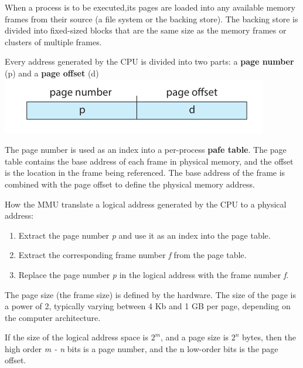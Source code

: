 \documentclass[10pt]{article}
\newcommand{\tf}{\textbf}
\newcommand{\ti}{\textit}
\begin{document}
\par{When a process is to be executed,its pages are loaded into any available memory frames from their source (a file system or the backing store). The backing store is divided into fixed-sized blocks that are the same size as the memory frames or clusters of multiple frames.} \\ 

\par{Every address generated by the CPU is divided into two parts: a \tf{page number} (p) and a \tf{page offset} (d)} \\

\bigbreak
\includegraphics[scale = 0.7]{address-paging.png}
\bigbreak

\par{The page number is used as an index into a per-process \tf{pafe table}. The page table contains the base address of each frame in physical memory, and the offset is the location in the frame being referenced. The base address of the frame is combined with the page offset to define the physical memory address.} \\

\par{How the MMU translate a logical address generated by the CPU to a physical address:} \\

\begin{enumerate}
	\item Extract the page number \ti{p} and use it as an index into the page table.
	\item Extract the corresponding frame number \ti{f} from the page table.
	\item Replace the page number \ti{p} in the logical address with the frame number \ti{f}.
\end{enumerate}

\par{The page size (the frame size) is defined by the hardware. The size of the page is a power of 2, typically varying between 4 Kb and 1 GB per page, depending on the computer architecture.}

\par{If the size of the logical address space is $2^m$, and a page size is $2^n$ bytes, then the high order \ti{m - n} bits is a page number, and the n low-order bits is the page offset.} \\
\end{document}
